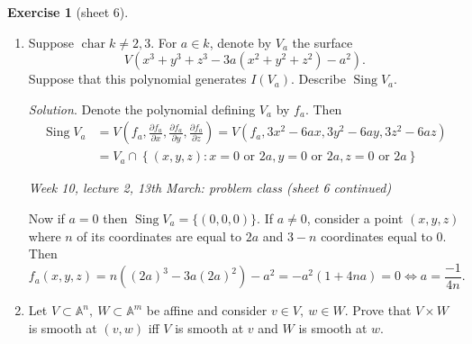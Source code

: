 \documentclass{article}
\newcommand{\A}{\mathbb{A}}
\newcommand{\Char}{\operatorname{char}}
\newcommand{\Sing}{\operatorname{Sing}}
\theoremstyle{definition}
\newtheorem{exe}[defn]{Exercise}
\begin{document}
\begin{exe}[sheet 6]
\begin{enumerate}
\item Suppose $\Char k\neq 2,3$. For $a\in k$, denote by $V_a$ the surface
\[
V(x^3+y^3+z^3-3a(x^2+y^2+z^2)-a^2).
\]
Suppose that this polynomial generates $I(V_a)$. Describe $\Sing V_a$.

\textit{Solution}. Denote the polynomial defining $V_a$ by $f_a$. Then
\[
\begin{aligned}
\Sing V_a&=V\left(f_a,\frac{\partial f_a}{\partial x},\frac{\partial f_a}{\partial y},\frac{\partial f_a}{\partial z}\right)=V\left(f_a,3x^2-6ax,3y^2-6ay,3z^2-6az\right)\\
&=V_a\cap\left\{(x,y,z):x=0\text{ or }2a,y=0\text{ or }2a,z=0\text{ or }2a\right\}
\end{aligned}
\]

\begin{flushright}
\textit{Week 10, lecture 2, 13th March: problem class (sheet 6 continued)}
\end{flushright}

Now if $a=0$ then $\Sing V_a=\{(0,0,0)\}.$ If $a\neq 0$, consider a point $(x,y,z)$ where $n$ of its coordinates are equal to $2a$ and $3-n$ coordinates equal to 0. Then
\[
f_a(x,y,z)=n((2a)^3-3a(2a)^2)-a^2=-a^2(1+4na)=0\iff a=\frac{-1}{4n}.
\]

\item Let $V\subset\A^n,\ W\subset\A^m$ be affine and consider $v\in V,\ w\in W$. Prove that $V\times W$ is smooth at $(v,w)$ iff $V$ is smooth at $v$ and $W$ is smooth at $w$.


\end{enumerate}
\end{exe}
\end{document}
